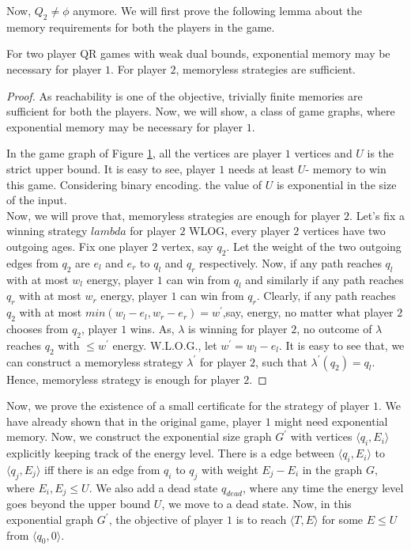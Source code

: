 Now, $Q_2 \not = \phi$ anymore. We will first prove the following lemma about the memory requirements for both the players in the game.\\
\begin{lemma}
\label{mem-lemma}
For two player QR games with weak dual bounds, exponential memory may be necessary for player $1$. For player $2$, memoryless strategies are sufficient.
\end{lemma}
\begin{proof}
As reachability is one of the objective, trivially finite memories are sufficient for both the players. Now, we will show, a class of game graphs, where exponential memory may be necessary for player $1$.\\
\begin{figure}[htb]
\hskip 6cm
\label{expmem-p1}

\end{figure}

In the game graph of Figure \ref{expmem-p1}, all the vertices are player $1$  vertices and $U$ is the strict upper bound. It is easy to see, player $1$ needs at least $U$- memory to win this game. Considering binary encoding. the value of $U$ is exponential in the size of the input.\\
Now, we will prove that, memoryless strategies are enough for player $2$. Let's fix a winning strategy $lambda$ for player $2$  WLOG, every player $2$ vertices have two outgoing ages. Fix one player $2$ vertex, say $q_2$. Let the weight of the two outgoing edges from $q_2$ are $e_l$ and $e_r$ to $q_l$ and $q_r$ respectively. Now, if any path reaches $q_l$ with at most $w_l$ energy, player $1$ can win from $q_l$ and similarly if any path reaches $q_r$ with at most $w_r$ energy, player $1$ can win from $q_r$. Clearly, if any path reaches $q_2$ with at most $min(w_l-e_l, w_r-e_r)= w^{\prime}$,say, energy, no matter what player $2$ chooses from $q_2$, player $1$ wins. As, $\lambda$ is winning for player $2$, no outcome of $\lambda$ reaches $q_2$ with $\leq w^{\prime}$ energy. W.L.O.G., let $w^{\prime}= w_l -e_l$. It is easy to see that, we can construct a memoryless strategy $\lambda^{\prime}$ for player $2$, such that $\lambda^{\prime}(q_2)=q_l$. Hence, memoryless strategy is enough for player $2$.
\end{proof}
\vskip 0.5cm
\vskip 0.2cm
Now, we prove the existence of a small certificate for the strategy of player $1$. We have already shown that in the original game, player $1$ might need exponential memory. Now, we construct the exponential size graph $G^{\prime}$ with vertices $\langle q_i, E_i \rangle$ explicitly keeping track of the energy level. There is a edge between $\langle q_i, E_i \rangle$ to $\langle q_j, E_j \rangle$ iff there is an edge from $q_i$ to $q_j$ with weight $E_j -E_i$ in the graph $G$, where $E_i, E_j \leq U$. We also add a dead state $q_{dead}$, where any time the energy level goes beyond the upper bound $U$, we move to a dead state. Now, in this exponential graph $G^{\prime}$, the objective of player $1$ is to reach $\langle T,E \rangle$ for some $E \leq U$ from $\langle q_0,0 \rangle$.\\
